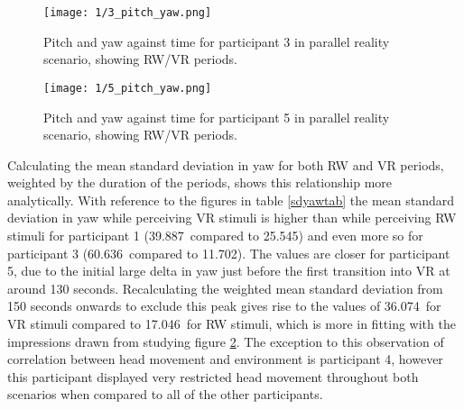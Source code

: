 \begin{figure}
	\begin{center}
	\texttt{[image: 1/3\_pitch\_yaw.png]}
	\caption{Pitch and yaw against time for participant 3 in parallel reality scenario, showing RW/VR periods.}
	\label{3_pitch_yaw.png}
	\end{center}
\end{figure}

\begin{figure}
	\begin{center}
	\texttt{[image: 1/5\_pitch\_yaw.png]}
	\caption{Pitch and yaw against time for participant 5 in parallel reality scenario, showing RW/VR periods.}
	\label{5_pitch_yaw.png}
	\end{center}
\end{figure}

Calculating the mean standard deviation in yaw for both RW and VR periods, weighted by the duration of the periods, shows this relationship more analytically. With reference to the figures in table \ref{sdyawtab} the mean standard deviation in yaw while perceiving VR stimuli is higher than while perceiving RW stimuli for participant 1 (39.887\textdegree\ compared to 25.545\textdegree) and even more so for participant 3 (60.636\textdegree\ compared to 11.702\textdegree). The values are closer for participant 5, due to the initial large delta in yaw just before the first transition into VR at around 130 seconds. Recalculating the weighted mean standard deviation from 150 seconds onwards to exclude this peak gives rise to the values of 36.074\textdegree\ for VR stimuli compared to 17.046\textdegree\ for RW stimuli, which is more in fitting with the impressions drawn from studying figure \ref{5_pitch_yaw.png}. The exception to this observation of correlation between head movement and environment is participant 4, however this participant displayed very restricted head movement throughout both scenarios when compared to all of the other participants.

